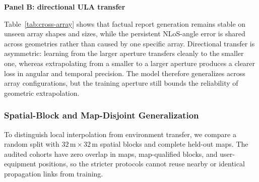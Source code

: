 \begin{table}[H]
\textbf{Panel B: directional ULA transfer}\par\vspace{2pt}
\label{tab:directional-ula}
\end{table}

Table~\ref{tab:cross-array} shows that factual report generation remains stable on unseen array shapes
and sizes, while the persistent NLoS-angle error is shared across geometries rather than caused by one
specific array. Directional transfer is asymmetric: learning from the larger aperture transfers cleanly
to the smaller one, whereas extrapolating from a smaller to a larger aperture produces a clearer loss
in angular and temporal precision. The model therefore generalizes across array configurations, but
the training aperture still bounds the reliability of geometric extrapolation.

\subsubsection{Spatial-Block and Map-Disjoint Generalization}

To distinguish local interpolation from environment transfer, we compare a random split with
$32\,\mathrm{m}\times32\,\mathrm{m}$ spatial blocks and complete held-out maps. The audited cohorts
have zero overlap in maps, map-qualified blocks, and user-equipment positions, so the stricter
protocols cannot reuse nearby or identical propagation links from training.


